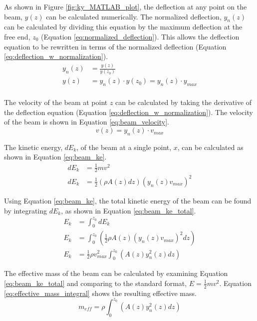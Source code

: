 As shown in Figure \ref{fig:ky_MATLAB_plot}, the deflection at any point on the beam, $y(z)$ can be calculated numerically.  The normalized deflection, $y_n(z)$ can be calculated by dividing this equation by the maximum deflection at the free end, $z_0$ (Equation \ref{eq:normalized_deflection}).  This allows the deflection equation to be rewritten in terms of the normalized deflection (Equation \ref{eq:deflection_w_normalization}).
\begin{align}
	y_n(z) &= \frac{y(z)}{y(z_0)} \label{eq:normalized_deflection} \\
	y(z) &= y_n(z) \cdot y(z_0) = y_n(z) \cdot y_{max} \label{eq:deflection_w_normalization} \\
\end{align}

The velocity of the beam at point $z$ can be calculated by taking the derivative of the deflection equation (Equation \ref{eq:deflection_w_normalization}).  The velocity of the beam is shown in Equation \ref{eq:beam_velocity}.
\begin{equation} \label{eq:beam_velocity}
	v(z) = y_n(z) \cdot v_{max}
\end{equation}

The kinetic energy, $dE_k$, of the beam at a single point, $x$, can be calculated as shown in Equation \ref{eq:beam_ke}.
\begin{align}
	dE_k &= \frac{1}{2} m v^2 \nonumber \\
	dE_k &= \frac{1}{2} \left(\rho A(z) dz\right) \left(y_n(z) v_{max}\right)^2  \label{eq:beam_ke}
\end{align}

Using Equation \ref{eq:beam_ke}, the total kinetic energy of the beam can be found by integrating $dE_k$, as shown in Equation \ref{eq:beam_ke_total}.
\begin{align}
	E_k &= \int_{0}^{z_0}{dE_k} \\
	E_k &= \int_{0}^{z_0}{\left(\frac{1}{2} \rho A(z) \left(y_n(z) v_{max}\right)^2 dz \right)} \\
	E_k &= \frac{1}{2} \rho v_{max}^2 \int_{0}^{z_0}{\left(A(z) y_n^2(z) dz \right)} \label{eq:beam_ke_total}
\end{align}

The effective mass of the beam can be calculated by examining Equation \ref{eq:beam_ke_total} and comparing to the standard format, $E=\frac{1}{2}mv^2$.  Equation \ref{eq:effective_mass_integral} shows the resulting effective mass.
\begin{equation} \label{eq:effective_mass_integral}
	m_{eff} = \rho \int_{0}^{z_0}{\left(A(z) y_n^2(z) dz \right)}
\end{equation}

